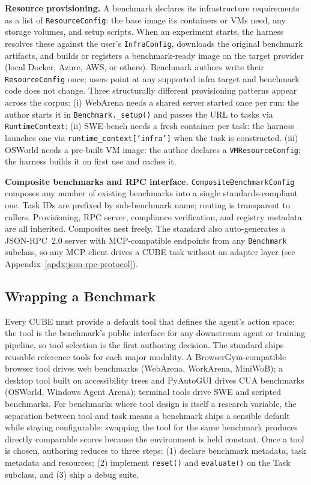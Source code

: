 \documentclass{article}
\newcommand{\mypar}[1]{\par\noindent\textbf{#1}\enspace}
\begin{document}
\mypar{Resource provisioning.}
A benchmark declares its infrastructure requirements as a list of \texttt{ResourceConfig}: the base image its containers or VMs need, any storage volumes, and setup scripts.
When an experiment starts, the harness resolves these against the user's \texttt{InfraConfig}, downloads the original benchmark artifacts, and builds or registers a benchmark-ready image on the target provider (local Docker, Azure, AWS, or others).
Benchmark authors write their \texttt{ResourceConfig} once; users point at any supported infra target and benchmark code does not change.
Three structurally different provisioning patterns appear across the corpus:
(i) WebArena needs a shared server started once per run: the author starts it in
\texttt{Benchmark.\_setup()} and passes the URL to tasks via \texttt{RuntimeContext};
(ii) SWE-bench needs a fresh container per task: the harness launches one via \texttt{runtime\_context['infra']} when the task is constructed.
(iii) OSWorld needs a pre-built VM image: the author declares a \texttt{VMResourceConfig}; the harness builds it on first use and caches it.

\mypar{Composite benchmarks and RPC interface.}
\texttt{CompositeBenchmarkConfig} composes any number of existing benchmarks into a single standards-compliant one. Task IDs are prefixed by sub-benchmark name; routing is transparent to callers. Provisioning, RPC server, compliance verification, and registry metadata are all inherited. Composites nest freely.
The standard also auto-generates a JSON-RPC~2.0 server with MCP-compatible endpoints from any \texttt{Benchmark} subclass, so any MCP client drives a CUBE task without an adapter layer (see Appendix~\ref{apdx:json-rpc-protocol}).

\subsection{Wrapping a Benchmark}
\label{sec:standard-author}

Every CUBE must provide a default tool that defines the agent's action space:
the tool is the benchmark's public interface for any downstream agent or
training pipeline, so tool selection is the first authoring decision.
The standard ships reusable reference tools for each major modality.
A BrowserGym-compatible browser tool drives web benchmarks (WebArena,
WorkArena, MiniWoB); a desktop tool built on accessibility trees and
PyAutoGUI drives CUA benchmarks (OSWorld, Windows Agent Arena); terminal
tools drive SWE and scripted benchmarks.
For benchmarks where tool design is itself a research variable, the separation
between tool and task means a benchmark ships a sensible default while staying
configurable: swapping the tool for the same benchmark produces directly
comparable scores because the environment is held constant.
Once a tool is chosen, authoring reduces to three steps: (1) declare benchmark metadata, task metadata and
resources; (2) implement \texttt{reset()} and \texttt{evaluate()} on the Task subclass, and (3) ship a debug suite.
\end{document}
